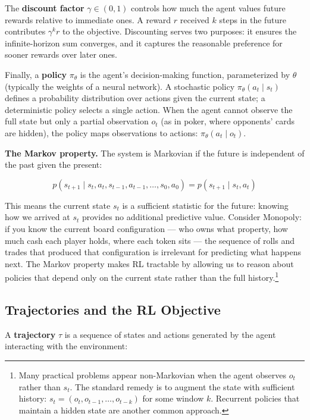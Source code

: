 \documentclass{book}
\begin{document}
The \textbf{discount factor} $\gamma \in (0, 1)$ controls how much the
agent values future rewards relative to immediate ones. A reward $r$
received $k$ steps in the future contributes $\gamma^k r$ to the objective.
Discounting serves two purposes: it ensures the infinite-horizon sum
converges, and it captures the reasonable preference for sooner rewards
over later ones.

Finally, a \textbf{policy} $\pi_\theta$ is the agent's decision-making
function, parameterized by $\theta$ (typically the weights of a neural
network). A stochastic policy $\pi_\theta(a_t \mid s_t)$ defines a
probability distribution over actions given the current state; a
deterministic policy selects a single action. When the agent cannot observe
the full state but only a partial observation $o_t$ (as in poker, where
opponents' cards are hidden), the policy maps observations to actions:
$\pi_\theta(a_t \mid o_t)$.

\textbf{The Markov property.} The system is Markovian if the future is
independent of the past given the present:

\begin{equation}
\label{eq:markov}
p(s_{t+1} \mid s_t, a_t, s_{t-1}, a_{t-1}, \ldots, s_0, a_0)
= p(s_{t+1} \mid s_t, a_t)
\end{equation}

This means the current state $s_t$ is a sufficient statistic for the
future: knowing how we arrived at $s_t$ provides no additional predictive
value. Consider Monopoly: if you know the current board configuration ---
who owns what property, how much cash each player holds, where each token
sits --- the sequence of rolls and trades that produced that configuration
is irrelevant for predicting what happens next. The Markov property makes
RL tractable by allowing us to reason about policies that depend only on
the current state rather than the full history.\footnote{Many practical
problems appear non-Markovian when the agent observes $o_t$ rather than
$s_t$. The standard remedy is to augment the state with sufficient history:
$s_t = (o_t, o_{t-1}, \ldots, o_{t-k})$ for some window $k$. Recurrent
policies that maintain a hidden state are another common approach.}

\subsection{Trajectories and the RL Objective}
\label{sec:rl_objective}

A \textbf{trajectory} $\tau$ is a sequence of states and actions generated
by the agent interacting with the environment:
\end{document}
